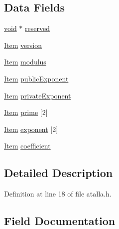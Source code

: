 \subsection*{Data Fields}
\begin{DoxyCompactItemize}
\item 
\hyperlink{hw__4758__cca_8h_afad4d591c7931ff6dc5bf69c76c96aa0}{void} $\ast$ \hyperlink{struct_r_s_a_private_key_str_a4544f2a75ed89c0744fd045d631cf3d9}{reserved}
\item 
\hyperlink{atalla_8h_a4a0aaa01a3bc2778b4b827fe46635051}{Item} \hyperlink{struct_r_s_a_private_key_str_a35a5e25b1b62b3741bb2c9bbb0782104}{version}
\item 
\hyperlink{atalla_8h_a4a0aaa01a3bc2778b4b827fe46635051}{Item} \hyperlink{struct_r_s_a_private_key_str_a029a6606f94957822a70ac0fb92a3ac7}{modulus}
\item 
\hyperlink{atalla_8h_a4a0aaa01a3bc2778b4b827fe46635051}{Item} \hyperlink{struct_r_s_a_private_key_str_a2829f1b805c79728b870a861d107567e}{public\+Exponent}
\item 
\hyperlink{atalla_8h_a4a0aaa01a3bc2778b4b827fe46635051}{Item} \hyperlink{struct_r_s_a_private_key_str_a490e24a12dabb408ef1780f2ef87c176}{private\+Exponent}
\item 
\hyperlink{atalla_8h_a4a0aaa01a3bc2778b4b827fe46635051}{Item} \hyperlink{struct_r_s_a_private_key_str_a31644a784403963a237eeb8c2f779f68}{prime} \mbox{[}2\mbox{]}
\item 
\hyperlink{atalla_8h_a4a0aaa01a3bc2778b4b827fe46635051}{Item} \hyperlink{struct_r_s_a_private_key_str_a4966db388f6458949169ab6c46242e8e}{exponent} \mbox{[}2\mbox{]}
\item 
\hyperlink{atalla_8h_a4a0aaa01a3bc2778b4b827fe46635051}{Item} \hyperlink{struct_r_s_a_private_key_str_a8b1392de37feffb8710189ba894eb587}{coefficient}
\end{DoxyCompactItemize}


\subsection{Detailed Description}


Definition at line 18 of file atalla.\+h.



\subsection{Field Documentation}
